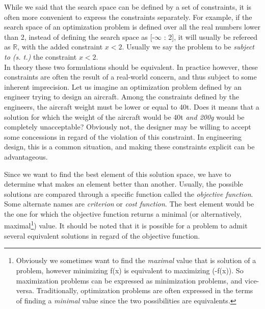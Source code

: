 While we said that the search space can be defined by a set of constraints, it is often more convenient to express the constraints separately. For example, if the search space of an optimization problem is defined over all the real numbers lower than 2, instead of defining the search space as [-\(\infty\) : 2], it will usually be refereed as \(\mathbb{R}\), with the added constraint \(x < 2\). Usually we say the problem to be \emph{subject to (s. t.)} the constraint \(x < 2\).\\
In theory these two formulations should be equivalent. In practice however, these constraints are often the result of a real-world concern, and thus subject to some inherent imprecision. Let us imagine an optimization problem defined by an engineer trying to design an aircraft. Among the constraints defined by the engineers, the aircraft weight must be lower or equal to 40t. Does it means that a solution for which the weight of the aircraft would be 40t \emph{and 200g} would be completely unacceptable? Obviously not, the designer may be willing to accept some concessions in regard of the violation of this constraint. In engineering design, this is a common situation, and making these constraints explicit can be advantageous.

Since we want to find the best element of this solution space, we have to determine what makes an element better than another. Usually, the possible solutions are compared through a specific function called the \emph{objective function}. Some alternate names are \emph{criterion} or \emph{cost function}. The best element would be the one for which the objective function returns a minimal (or alternatively, maximal\footnote{Obviously we sometimes want to find the \emph{maximal} value that is solution of a problem, however minimizing f(x) is equivalent to maximizing (-f(x)). So maximization problems can be expressed as minimization problems, and vice-versa. Traditionally, optimization problems are often expressed in the terms of finding a \emph{minimal} value since the two possibilities are equivalents.}) value. It should be noted that it is possible for a problem to admit several equivalent solutions in regard of the objective function.


